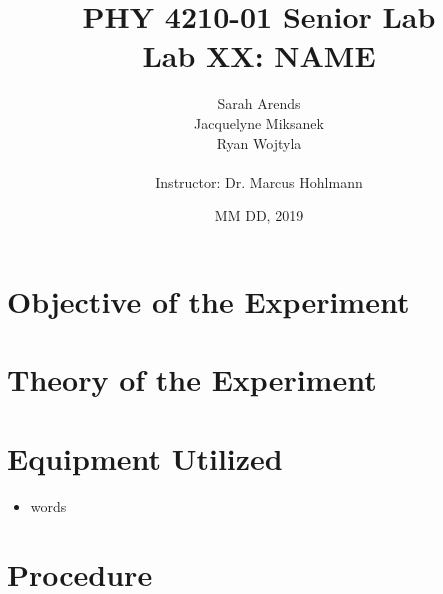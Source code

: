 \documentclass[a4paper]{article}
\title{PHY 4210-01 Senior Lab \\Lab XX: NAME}
\author{Sarah Arends \\ 
        Jacquelyne Miksanek \\
        Ryan Wojtyla \\ \\
        Instructor: Dr. Marcus Hohlmann}
\date{MM DD, 2019}
\begin{document}
\maketitle 

\begin{abstract}
  \qq 
\end{abstract}

\newpage

\tableofcontents

\newpage

\section{Objective of the Experiment}
\qq 

\section{Theory of the Experiment}
\qq


\section{Equipment Utilized}
\begin{itemize}
\item words
\end{itemize}

\begin{figure}[H]
\centering
\label{name}
\end{figure}

\section{Procedure}

\qq
\end{document}
